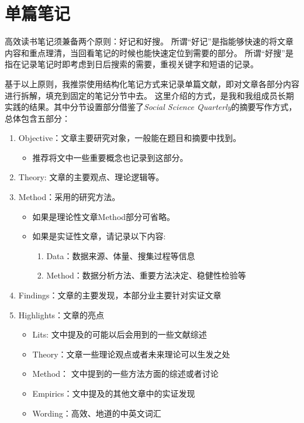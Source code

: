 \documentclass[
  letterpaper,
  DIV=11,
  numbers=noendperiod,
  oneside]{scrreprt}
\providecommand{\tightlist}{%
  \setlength{\itemsep}{0pt}\setlength{\parskip}{0pt}}\usepackage{longtable,booktabs,array}
\begin{document}
\hypertarget{ux5355ux7bc7ux7b14ux8bb0}{%
\section{单篇笔记}\label{ux5355ux7bc7ux7b14ux8bb0}}

高效读书笔记须兼备两个原则：好记和好搜。
所谓``好记''是指能够快速的将文章内容和重点理清，当回看笔记的时候也能快速定位到需要的部分。
所谓``好搜''是指在记录笔记时即考虑到日后搜索的需要，重视关键字和短语的记录。

基于以上原则，我推崇使用结构化笔记方式来记录单篇文献，即对文章各部分内容进行拆解，填充到固定的笔记分节中去。
这里介绍的方式，是我和我组成员长期实践的结果。其中分节设置部分借鉴了\emph{Social
Science Quarterly}的摘要写作方式，总体包含五部分：

\begin{enumerate}
\def\labelenumi{\arabic{enumi}.}
\tightlist
\item
  Objective：文章主要研究对象，一般能在题目和摘要中找到。

  \begin{itemize}
  \tightlist
  \item
    推荐将文中一些重要概念也记录到这部分。
  \end{itemize}
\item
  Theory: 文章的主要观点、理论逻辑等。
\item
  Method：采用的研究方法。

  \begin{itemize}
  \tightlist
  \item
    如果是理论性文章Method部分可省略。
  \item
    如果是实证性文章，请记录以下内容:

    \begin{enumerate}
    \def\labelenumii{\arabic{enumii}.}
    \tightlist
    \item
      Data：数据来源、体量、搜集过程等信息
    \item
      Method：数据分析方法、重要方法决定、稳健性检验等
    \end{enumerate}
  \end{itemize}
\item
  Findings：文章的主要发现，本部分业主要针对实证文章
\item
  Highlights：文章的亮点

  \begin{itemize}
  \tightlist
  \item
    Lits: 文中提及的可能以后会用到的一些文献综述
  \item
    Theory：文章一些理论观点或者未来理论可以生发之处
  \item
    Method： 文中提到的一些方法方面的综述或者讨论
  \item
    Empirics：文中提及的其他文章中的实证发现
  \item
    Wording：高效、地道的中英文词汇
  \end{itemize}
\end{enumerate}
\end{document}
